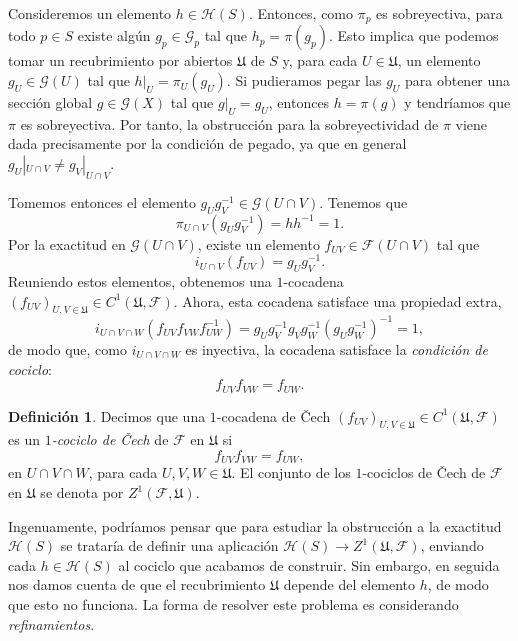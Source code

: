 \documentclass[12pt,a4paper]{article}
\theoremstyle{definition} \newtheorem{defn}[thm]{Definición}
\theoremstyle{definition} \newtheorem{ejemplo}[thm]{Ejemplo}
\theoremstyle{definition} \newtheorem{ejercicio}[thm]{Ejercicio}
\def\FF{\mathscr{F}}
\def\GG{\mathscr{G}}
\def\HH{\mathscr{H}}
\def\UU{\mathfrak{U}}
\begin{document}
    Consideremos un elemento $h\in \HH(S)$. Entonces, como $\pi_p$ es sobreyectiva, para todo $p\in S$ existe algún $g_p \in \GG_p$ tal que $h_p=\pi(g_p)$. Esto implica que podemos tomar un recubrimiento por abiertos $\mathfrak{U}$ de $S$ y, para cada $U\in \mathfrak{U}$, un elemento $g_U\in \GG(U)$ tal que $h|_U=\pi_U(g_U)$. Si pudieramos pegar las $g_U$ para obtener una sección global $g\in \GG(X)$ tal que $g|_U = g_U$, entonces $h=\pi(g)$ y tendríamos que $\pi$ es sobreyectiva. Por tanto, la obstrucción para la sobreyectividad de $\pi$ viene dada precisamente por la condición de pegado, ya que en general $g_U|_{U\cap V} \neq g_V|_{U\cap V}$. 
    
    Tomemos entonces el elemento $g_Ug_V^{-1} \in \GG(U\cap V)$. Tenemos que
    \begin{equation*}
      \pi_{U\cap V} (g_U g_V^{-1}) = h h^{-1} = 1.
    \end{equation*}
    Por la exactitud en $\GG(U\cap V)$, existe un elemento $f_{UV}\in \FF(U\cap V)$ tal que
    \begin{equation*}
      i_{U\cap V} (f_{UV}) = g_U g_V^{-1}.
    \end{equation*}
    Reuniendo estos elementos, obtenemos una $1$-cocadena $(f_{UV})_{U,V \in \mathfrak{U}} \in C^1(\UU,\FF)$. Ahora, esta cocadena satisface una propiedad extra,
    \begin{equation*}
      i_{U\cap V\cap W}(f_{UV} f_{VW} f_{UW}^{-1}) = g_U g_V^{-1} g_V g_W^{-1} (g_U g_W^{-1})^{-1} = 1,
    \end{equation*}
    de modo que, como $i_{U\cap V\cap W}$ es inyectiva, la cocadena satisface la \emph{condición de cociclo}:
    \begin{equation*}
      f_{UV} f_{VW} = f_{UW}.
    \end{equation*}

    \begin{defn}
      Decimos que una $1$-cocadena de \v{C}ech $(f_{UV})_{U,V\in \mathfrak{U}}\in C^1(\UU,\FF)$ es un \emph{$1$-cociclo de \v{C}ech} de $\FF$ en $\UU$ si
    \begin{equation*}
      f_{UV} f_{VW} = f_{UW},
    \end{equation*}
    en $U\cap V \cap W$, para cada $U,V,W \in \UU$. El conjunto de los $1$-cociclos de \v{C}ech de $\FF$ en $\UU$ se denota por $Z^1(\FF,\UU)$.
    \end{defn}

    Ingenuamente, podríamos pensar que para estudiar la obstrucción a la exactitud $\HH(S)$ se trataría de definir una aplicación $\HH(S) \rightarrow Z^1(\UU,\FF)$, enviando cada $h\in \HH(S)$ al cociclo que acabamos de construir. Sin embargo, en seguida nos damos cuenta de que el recubrimiento $\UU$ depende del elemento $h$, de modo que esto no funciona. La forma de resolver este problema es considerando \emph{refinamientos}.
\end{document}
